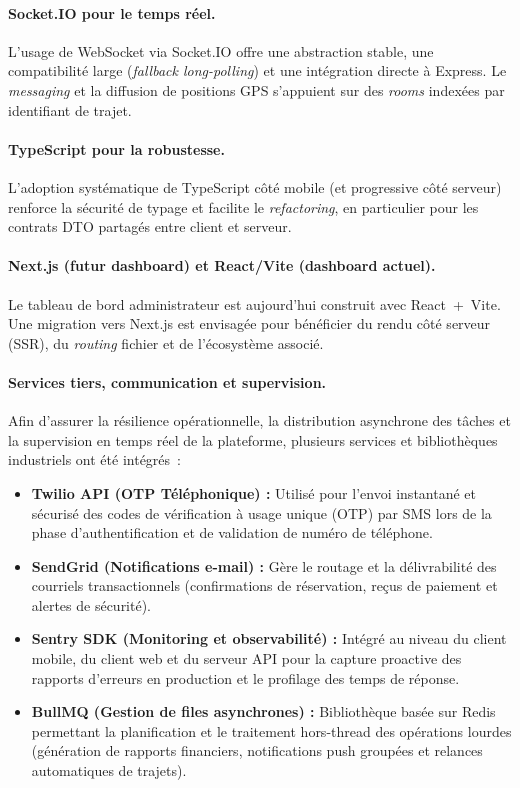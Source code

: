 \documentclass[12pt, a4paper, oneside]{report}
\begin{document}
\paragraph{Socket.IO pour le temps réel.} L'usage de WebSocket via Socket.IO offre une abstraction stable, une compatibilité large (\textit{fallback long-polling}) et une intégration directe à Express. Le \textit{messaging} et la diffusion de positions GPS s'appuient sur des \textit{rooms} indexées par identifiant de trajet.

\paragraph{TypeScript pour la robustesse.} L'adoption systématique de TypeScript côté mobile (et progressive côté serveur) renforce la sécurité de typage et facilite le \textit{refactoring}, en particulier pour les contrats DTO partagés entre client et serveur.

\paragraph{Next.js (futur dashboard) et React/Vite (dashboard actuel).} Le tableau de bord administrateur est aujourd'hui construit avec React~+~Vite. Une migration vers Next.js est envisagée pour bénéficier du rendu côté serveur (SSR), du \textit{routing} fichier et de l'écosystème associé.

\paragraph{Services tiers, communication et supervision.} Afin d'assurer la résilience opérationnelle, la distribution asynchrone des tâches et la supervision en temps réel de la plateforme, plusieurs services et bibliothèques industriels ont été intégrés~:
\begin{itemize}
  \item \textbf{Twilio API (OTP Téléphonique) :} Utilisé pour l'envoi instantané et sécurisé des codes de vérification à usage unique (OTP) par SMS lors de la phase d'authentification et de validation de numéro de téléphone.
  \item \textbf{SendGrid (Notifications e-mail) :} Gère le routage et la délivrabilité des courriels transactionnels (confirmations de réservation, reçus de paiement et alertes de sécurité).
  \item \textbf{Sentry SDK (Monitoring et observabilité) :} Intégré au niveau du client mobile, du client web et du serveur API pour la capture proactive des rapports d'erreurs en production et le profilage des temps de réponse.
  \item \textbf{BullMQ (Gestion de files asynchrones) :} Bibliothèque basée sur Redis permettant la planification et le traitement hors-thread des opérations lourdes (génération de rapports financiers, notifications push groupées et relances automatiques de trajets).
\end{itemize}
\end{document}
